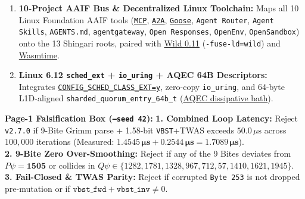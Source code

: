 \documentclass[10pt,twocolumn,letterpaper]{article}
\newcommand{\takeaway}[2]{%
  \vspace{2.5pt}\noindent\colorbox{softbg}{%
    \parbox{\dimexpr\columnwidth-2\fboxsep\relax}{%
      \vspace{2.5pt}\textbf{\color{dandelionblue}#1:}\hspace{0.4em}#2\vspace{2.5pt}%
    }%
  }\vspace{2.5pt}%
}
\begin{document}
\begin{enumerate}
  \item \textbf{10-Project AAIF Bus \& Decentralized Linux Toolchain:} Maps all 10 Linux Foundation AAIF tools (\href{https://github.com/modelcontextprotocol}{\texttt{MCP}}, \href{https://github.com/a2aproject/a2a}{\texttt{A2A}}, \href{https://github.com/aaif-goose/goose}{\texttt{Goose}}, \texttt{Agent Router}, \texttt{Agent Skills}, \texttt{AGENTS.md}, \texttt{agentgateway}, \texttt{Open Responses}, \texttt{OpenEnv}, \texttt{OpenSandbox}) onto the 13 Shingari roots, paired with \href{https://github.com/wild-linker/wild}{Wild 0.11} (\texttt{-fuse-ld=wild}) and \href{https://github.com/bytecodealliance/wasmtime}{Wasmtime}.
  \item \textbf{Linux 6.12 \texttt{sched\_ext} + \texttt{io\_uring} + AQEC 64B Descriptors:} Integrates \href{https://github.com/sched-ext/scx}{\texttt{CONFIG\_SCHED\_CLASS\_EXT=y}}, zero-copy \texttt{io\_uring}, and 64-byte L1D-aligned \texttt{sharded\_quorum\_entry\_64b\_t} (\href{https://arxiv.org/abs/2509.26042}{AQEC dissipative bath}).
\end{enumerate}

\takeaway{Page-1 Falsification Box (\texttt{--seed 42})}{%
  \textbf{1. Combined Loop Latency:} Reject \texttt{v2.7.0} if 9-Bite Grimm parse + 1.58-bit \texttt{VBST}+TWAS exceeds $50.0\,\mu\text{s}$ across $100,000$ iterations (Measured: $\mathbf{1.4545\,\mu\text{s}} + \mathbf{0.2544\,\mu\text{s}} = \mathbf{1.7089\,\mu\text{s}}$).\\
  \textbf{2. 9-Bite Zero Over-Smoothing:} Reject if any of the 9 Bites deviates from $P\psi = \mathbf{1505}$ or collides in $Q\psi \in \{1282, 1781, 1328, 967, 712, 57, 1410, 1621, 1945\}$.\\
  \textbf{3. Fail-Closed \& TWAS Parity:} Reject if corrupted \texttt{Byte 253} is not dropped pre-mutation or if $\texttt{vbst\_fwd} + \texttt{vbst\_inv} \neq 0$.
}
\end{document}
